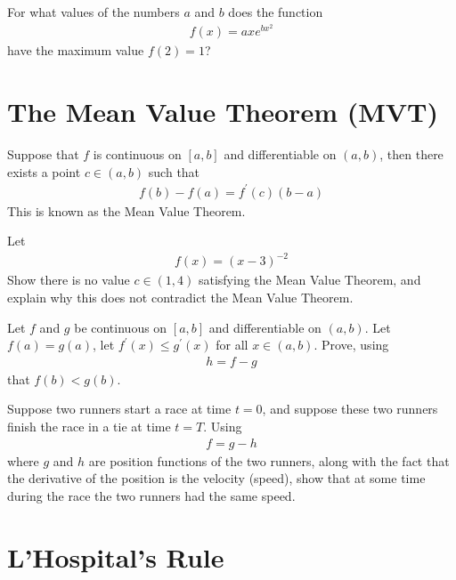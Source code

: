 \begin{exercise}
For what values of the numbers $a$ and $b$ does the function
\begin{align*}
    f(x) = axe^{bx^{2}}
\end{align*}
have the maximum value $f(2) = 1$?
\end{exercise}

\newpage
\section{The Mean Value Theorem (MVT)}

\begin{theorem}
Suppose that $f$ is continuous on $[a, b]$ and differentiable on $(a, b)$, then there exists a point $c \in (a, b)$ such that
\begin{align*}
    f(b) - f(a) = f^{'}(c)(b - a)
\end{align*}
This is known as the Mean Value Theorem.
\end{theorem}

\begin{exercise}
Let 
\begin{align*}
    f(x) = (x-3)^{-2}
\end{align*}
Show there is no value $c \in (1,4)$ satisfying the Mean Value Theorem, and explain why this does not contradict the Mean Value Theorem. 
\end{exercise}

\begin{exercise}
Let $f$ and $g$ be continuous on $[a, b]$ and differentiable on $(a, b)$. Let $f(a) = g(a)$, let $f^{'}(x) \leq g^{'}(x)$ for all $x \in (a, b)$. Prove, using
\begin{align*}
    h = f - g
\end{align*}
that $f(b) < g(b)$.
\end{exercise}

\begin{exercise}
Suppose two runners start a race at time $t = 0$, and suppose these two runners finish the race in a tie at time $t = T$. Using
\begin{align*}
    f = g - h
\end{align*}
where $g$ and $h$ are position functions of the two runners, along with the fact that the derivative of the position is the velocity (speed), show that at some time during the race the two runners had the same speed.
\end{exercise}

\newpage
\section{L'Hospital's Rule}


